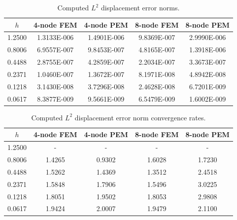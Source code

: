 \newpage
\begin{table}[!ht]
  \begin{center}
    \begin{tabular}{| c | c | c | c | c |}
    \hline
    $h$ & 4-node FEM & 4-node PEM & 8-node FEM & 8-node PEM \\ \hline
    1.2500 & 1.3133E-006 & 1.4901E-006 & 9.8369E-007 & 2.9990E-006 \\ \hline
    0.8006 & 6.9557E-007 & 9.8453E-007 & 4.8165E-007 & 1.3918E-006 \\ \hline
    0.4488 & 2.8755E-007 & 4.2859E-007 & 2.2034E-007 & 3.3673E-007 \\ \hline
    0.2371 & 1.0460E-007 & 1.3672E-007 & 8.1971E-008 & 4.8942E-008 \\ \hline
    0.1218 & 3.1430E-008 & 3.7296E-008 & 2.4628E-008 & 6.7201E-009 \\ \hline
    0.0617 & 8.3877E-009 & 9.5661E-009 & 6.5479E-009 & 1.6002E-009 \\
    \hline
    \end{tabular}
    \caption{Computed $L^2$ displacement error norms.}
    \vspace{-5pt}
    \label{tab:l2_error}
    \vspace{-25pt}
  \end{center}
\end{table}
\begin{table}[!ht]
  \begin{center}
    \begin{tabular}{| c | c | c | c | c |}
    \hline
    $h$ & 4-node FEM & 4-node PEM & 8-node FEM & 8-node PEM \\ \hline
    1.2500 &	-	&	-	&	-	&       -      \\ \hline
    0.8006 &	1.4265	&	0.9302	&	1.6028	&	1.7230 \\ \hline
    0.4488 &	1.5262	&	1.4369	&	1.3512	&	2.4518 \\ \hline
    0.2371 &	1.5848	&	1.7906	&	1.5496	&	3.0225 \\ \hline
    0.1218 &	1.8051	&	1.9502	&	1.8053	&	2.9808 \\ \hline
    0.0617 &	1.9424	&	2.0007	&	1.9479	&	2.1100 \\
    \hline
    \end{tabular}
    \caption{Computed $L^2$ displacement error norm convergence rates.}
    \vspace{-5pt}
    \label{tab:l2_rates}
    \vspace{-25pt}
  \end{center}
\end{table}

